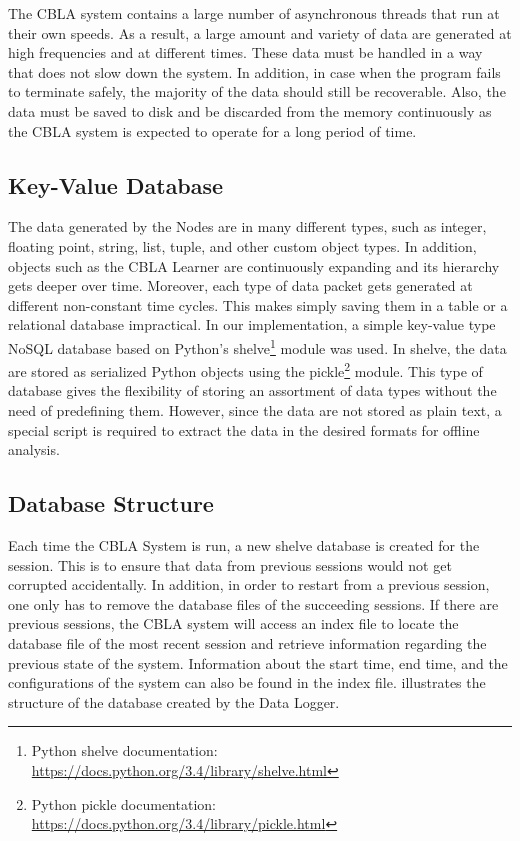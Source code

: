 The CBLA system contains a large number of asynchronous threads that run at their own speeds. As a result, a large amount and variety of data are generated at high frequencies and at different times. These data must be handled in a way that does not slow down the system. In addition, in case when the program fails to terminate safely, the majority of the data should still be recoverable. Also, the data must be saved to disk and be discarded from the memory continuously as the CBLA system is expected to operate for a long period of time.

\subsection{Key-Value Database}
 
The data generated by the Nodes are in many different types, such as integer, floating point, string, list, tuple, and other custom object types. In addition, objects such as the CBLA Learner are continuously expanding and its hierarchy gets deeper over time. Moreover, each type of data packet gets generated at different non-constant time cycles. This makes simply saving them in a table or a relational database impractical. In our implementation, a simple key-value type NoSQL database based on Python's shelve\footnote{Python shelve documentation: \url{https://docs.python.org/3.4/library/shelve.html}} module was used. In shelve, the data are stored as serialized Python objects using the pickle\footnote{Python pickle documentation: \url{https://docs.python.org/3.4/library/pickle.html}} module. This type of database gives the flexibility of storing an assortment of data types without the need of predefining them. However, since the data are not stored as plain text, a special script is required to extract the data in the desired formats for offline analysis. 

\subsection{Database Structure}

Each time the CBLA System is run, a new shelve database is created for the session. This is to ensure that data from previous sessions would not get corrupted accidentally. In addition, in order to restart from a previous session, one only has to remove the database files of the succeeding sessions. If there are previous sessions, the CBLA system will access an index file to locate the database file of the most recent session and retrieve information regarding the previous state of the system. Information about the start time, end time, and the configurations of the system can also be found in the index file.  illustrates the structure of the database created by the Data Logger. 

